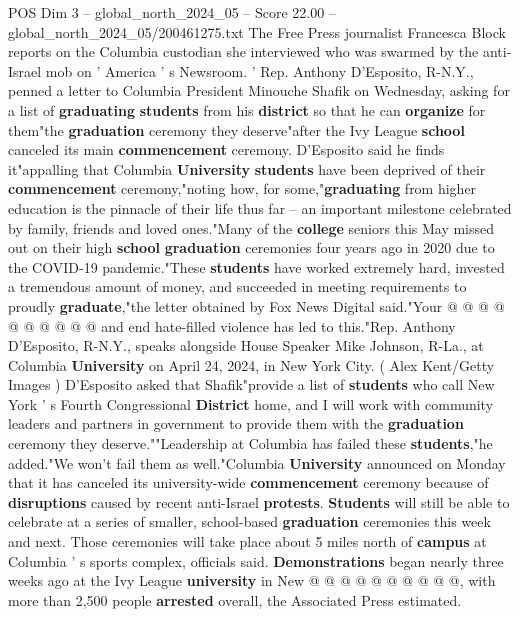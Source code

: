 \begin{textsample}{POS Dim 3 – global\_north\_2024\_05 – Score 22.00 – global\_north\_2024\_05/200461275.txt}  \label{ex:f3_pos_014}
The Free Press journalist Francesca Block reports on the Columbia custodian she interviewed who was swarmed by the anti-Israel mob on ' America ' s Newsroom. ' Rep.
Anthony D'Esposito, R-N.Y., penned a letter to Columbia President Minouche Shafik on Wednesday, asking for a list of \textbf{graduating} \textbf{students} from his \textbf{district} so that he can \textbf{organize} for them"the \textbf{graduation} ceremony they deserve"after the Ivy League \textbf{school} canceled its main \textbf{commencement} ceremony.
D'Esposito said he finds it"appalling that Columbia \textbf{University} \textbf{students} have been deprived of their \textbf{commencement} ceremony,"noting how, for some,"\textbf{graduating} from higher education is the pinnacle of their life thus far -- an important milestone celebrated by family, friends and loved ones."Many of the \textbf{college} seniors this May missed out on their high \textbf{school} \textbf{graduation} ceremonies four years ago in 2020 due to the COVID-19 pandemic."These \textbf{students} have worked extremely hard, invested a tremendous amount of money, and succeeded in meeting requirements to proudly \textbf{graduate},"the letter obtained by Fox News Digital said."Your @ @ @ @ @ @ @ @ @ @ and end hate-filled violence has led to this."Rep.
Anthony D'Esposito, R-N.Y., speaks alongside House Speaker Mike Johnson, R-La., at Columbia \textbf{University} on April 24, 2024, in New York City. ( Alex Kent/Getty Images ) D'Esposito asked that Shafik"provide a list of \textbf{students} who call New York ' s Fourth Congressional \textbf{District} home, and I will work with community leaders and partners in government to provide them with the \textbf{graduation} ceremony they deserve.""Leadership at Columbia has failed these \textbf{students},"he added."We won't fail them as well."Columbia \textbf{University} announced on Monday that it has canceled its university-wide \textbf{commencement} ceremony because of \textbf{disruptions} caused by recent anti-Israel \textbf{protests}. \textbf{Students} will still be able to celebrate at a series of smaller, school-based \textbf{graduation} ceremonies this week and next.
Those ceremonies will take place about 5 miles north of \textbf{campus} at Columbia ' s sports complex, officials said. \textbf{Demonstrations} began nearly three weeks ago at the Ivy League \textbf{university} in New @ @ @ @ @ @ @ @ @ @, with more than 2,500 people \textbf{arrested} overall, the Associated Press estimated.

\end{textsample}
